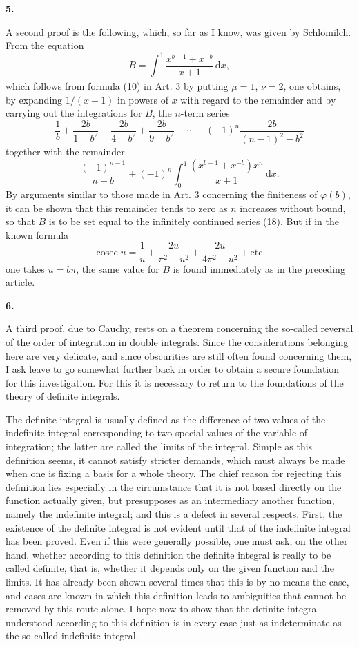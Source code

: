 \documentclass[11pt]{article}
\newcommand{\dd}{\,\mathrm d}
\newcommand{\cosec}{\operatorname{cosec}}
\newcommand{\art}[1]{\bigskip\begin{center}\large\bfseries #1.\end{center}\nopagebreak}
\begin{document}
\art{5}

A second proof is the following, which, so far as I know, was given by Schlömilch. From the equation
\[
B=\int_0^1\frac{x^{b-1}+x^{-b}}{x+1}\dd x,
\]
which follows from formula (10) in Art. 3 by putting $\mu=1$, $\nu=2$, one obtains, by expanding $1/(x+1)$ in powers of $x$ with regard to the remainder and by carrying out the integrations for $B$, the $n$-term series
\begin{equation}
\frac1b+\frac{2b}{1-b^2}-\frac{2b}{4-b^2}+\frac{2b}{9-b^2}-\cdots+(-1)^n\frac{2b}{(n-1)^2-b^2}
\tag{18}
\end{equation}
together with the remainder
\[
\frac{(-1)^{n-1}}{n-b}+(-1)^n\int_0^1\frac{(x^{b-1}+x^{-b})x^n}{x+1}\dd x.
\]
By arguments similar to those made in Art. 3 concerning the finiteness of $\varphi(b)$, it can be shown that this remainder tends to zero as $n$ increases without bound, so that $B$ is to be set equal to the infinitely continued series (18). But if in the known formula
\[
\cosec u=\frac1u+\frac{2u}{\pi^2-u^2}+\frac{2u}{4\pi^2-u^2}+\text{etc.}
\]
one takes $u=b\pi$, the same value for $B$ is found immediately as in the preceding article.

\art{6}

A third proof, due to Cauchy, rests on a theorem concerning the so-called reversal of the order of integration in double integrals. Since the considerations belonging here are very delicate, and since obscurities are still often found concerning them, I ask leave to go somewhat further back in order to obtain a secure foundation for this investigation. For this it is necessary to return to the foundations of the theory of definite integrals.

The definite integral is usually defined as the difference of two values of the indefinite integral corresponding to two special values of the variable of integration; the latter are called the limits of the integral. Simple as this definition seems, it cannot satisfy stricter demands, which must always be made when one is fixing a basis for a whole theory. The chief reason for rejecting this definition lies especially in the circumstance that it is not based directly on the function actually given, but presupposes as an intermediary another function, namely the indefinite integral; and this is a defect in several respects. First, the existence of the definite integral is not evident until that of the indefinite integral has been proved. Even if this were generally possible, one must ask, on the other hand, whether according to this definition the definite integral is really to be called definite, that is, whether it depends only on the given function and the limits. It has already been shown several times that this is by no means the case, and cases are known in which this definition leads to ambiguities that cannot be removed by this route alone. I hope now to show that the definite integral understood according to this definition is in every case just as indeterminate as the so-called indefinite integral.
\end{document}
